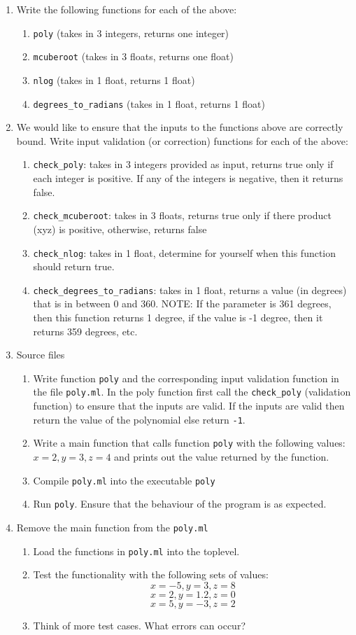 \documentclass{article}
\begin{document}
\begin{enumerate}
\item Write the following functions for each of the above:
	\begin{enumerate}
		\item {\tt poly} (takes in 3 integers, returns one integer)
		\item {\tt mcuberoot} (takes in 3 floats, returns one float)
		\item {\tt nlog} (takes in 1 float, returns 1 float)
		\item {\tt degrees\_to\_radians} (takes in 1 float, returns 1 float)
	\end{enumerate}
\item We would like to ensure that the inputs to the functions above are correctly bound. Write input validation (or correction) functions for each of the above:
	\begin{enumerate}
		\item {\tt check\_poly}: takes in 3 integers provided as input, returns true only if each integer is positive. If any of the integers is negative, then it returns false.
		\item {\tt check\_mcuberoot}: takes in 3 floats, returns true only if there product (xyz) is positive, otherwise, returns false
		\item {\tt check\_nlog}: takes in 1 float, determine for yourself when this function should return true.
		\item {\tt check\_degrees\_to\_radians}: takes in 1 float, returns a value (in degrees) that is in between 0 and 360. NOTE: If the parameter is 361 degrees, then this function returns 1 degree, if the value is -1 degree, then it returns 359 degrees, etc.
	\end{enumerate}
\item Source files
	\begin{enumerate}
		\item Write function {\tt poly} and the corresponding input validation function in the file {\tt poly.ml}. In the poly function first call the {\tt check\_poly} (validation function) to ensure that the inputs are valid. If the inputs are valid then return the value of the polynomial else return {\tt-1}.
		\item Write a main function that calls function {\tt poly} with the following values: $x = 2, y = 3, z = 4$ and prints out the value returned by the function.
		\item Compile {\tt poly.ml} into the executable {\tt poly}
		\item Run {\tt poly}. Ensure that the behaviour of the program is as expected.
	\end{enumerate}
\item Remove the main function from the {\tt poly.ml}
	\begin{enumerate}
		\item Load the functions in {\tt poly.ml} into the toplevel.
		\item Test the functionality with the following sets of values:
			$$x = -5, y = 3, z = 8$$
			$$x = 2, y = 1.2, z = 0$$
			$$x = 5, y = -3, z = 2$$
		\item Think of more test cases. What errors can occur?
	\end{enumerate}


\end{enumerate}
\end{document}
